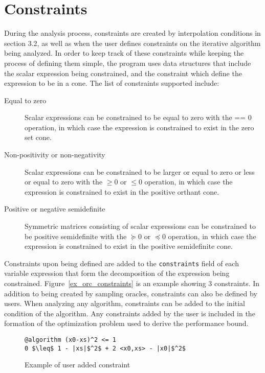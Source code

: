 \section{Constraints} \label{sec_constraints}
During the analysis process, constraints are created by interpolation conditions in section 3.2, as well as when the user defines constraints on the iterative algorithm being analyzed. In order to keep track of these constraints while keeping the process of defining them simple, the program uses data structures that include the scalar expression being constrained, and the constraint which define the expression to be in a cone. The list of constraints supported include:

\begin{description}
	\item[Equal to zero] Scalar expressions can be constrained to be equal to zero with the == 0 operation, in which case the expression is constrained to exist in the zero set cone.
	\item[Non-positivity or non-negativity] Scalar expressions can be constrained to be larger or equal to zero or less or equal to zero with the $\geq 0$ or $\leq 0$ operation, in which case the expression is constrained to exist in the positive orthant cone.
	\item[Positive or negative semidefinite] Symmetric matrices consisting of scalar expressions can be constrained to be positive semidefinite with the $\succeq 0$ or $\preceq 0$ operation, in which case the expression is constrained to exist in the positive semidefinite cone.
\end{description}

Constraints upon being defined are added to the \texttt{constraints} field of each variable expression that form the decomposition of the expression being constrained. Figure~\ref{ex_orc_constraints} is an example showing 3 constraints. In addition to being created by sampling oracles, constraints can also be defined by users. When analyzing any algorithm, constraints can be added to the initial condition of the algorithm. Any constraints added by the user is included in the formation of the optimization problem used to derive the performance bound.

\begin{figure}[h]
	\begin{lstlisting}[mathescape]
@algorithm (x0-xs)^2 <= 1
0 $\leq$ 1 - |xs|$^2$ + 2 <x0,xs> - |x0|$^2$
	\end{lstlisting}
	\caption{Example of user added constraint}
	\label{ex_user_constraints}
\end{figure}

